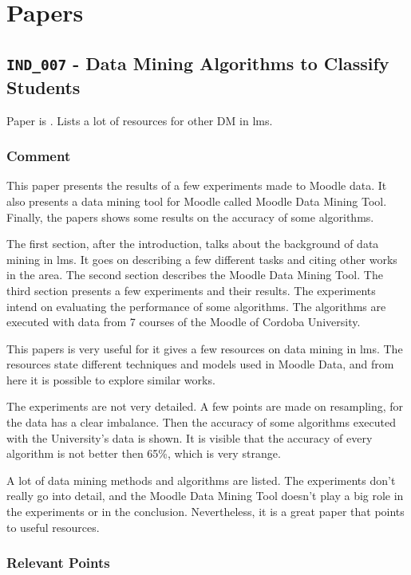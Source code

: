 \chapter{Papers}

\section{\texttt{IND\_007} - Data Mining Algorithms to Classify Students}

Paper is \cite{ind_007}. Lists a lot of resources for other DM in \gls{lms}.

\subsection{Comment}

This paper presents the results of a few experiments made to Moodle data. It
also presents a data mining tool for Moodle called Moodle Data Mining Tool.
Finally, the papers shows some results on the accuracy of some algorithms.

The first section, after the introduction, talks about the background of data
mining in \gls{lms}. It goes on describing a few different tasks and citing
other works in the area. The second section describes the Moodle Data Mining
Tool. The third section presents a few experiments and their results. The
experiments intend on evaluating the performance of some algorithms. The
algorithms are executed with data from 7 courses of the Moodle of Cordoba
University.

This papers is very useful for it gives a few resources on data mining in
\gls{lms}. The resources state different techniques and models used in Moodle
Data, and from here it is possible to explore similar works.

The experiments are not very detailed. A few points are made on resampling, for
the data has a clear imbalance. Then the accuracy of some algorithms executed
with the University's data is shown. It is visible that the accuracy of every
algorithm is not better then 65\%, which is very strange.

A lot of data mining methods and algorithms are listed. The experiments don't
really go into detail, and the Moodle Data Mining Tool doesn't play a big role
in the experiments or in the conclusion. Nevertheless, it is a great paper that
points to useful resources.

\subsection{Relevant Points}

